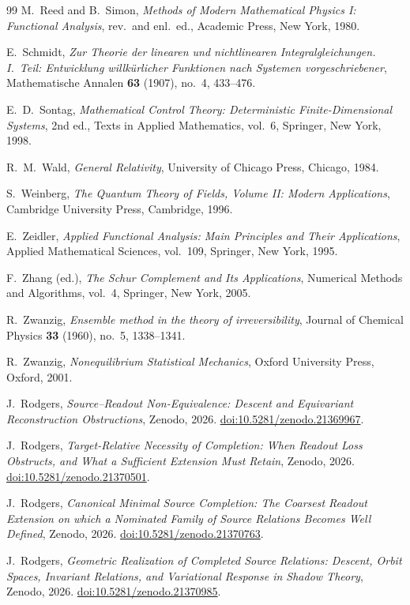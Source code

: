 \documentclass[11pt,reqno]{amsart}
\numberwithin{equation}{section}
\theoremstyle{plain}
\theoremstyle{definition}
\theoremstyle{remark}
\begin{document}
\begin{thebibliography}{99}
M.~Reed and B.~Simon,
\emph{Methods of Modern Mathematical Physics I: Functional Analysis},
rev.\ and enl.\ ed., Academic Press, New York, 1980.

E.~Schmidt,
\emph{Zur Theorie der linearen und nichtlinearen Integralgleichungen.
I.~Teil: Entwicklung willk\"urlicher Funktionen nach Systemen vorgeschriebener},
Mathematische Annalen \textbf{63} (1907), no.~4, 433--476.

E.~D.~Sontag,
\emph{Mathematical Control Theory: Deterministic Finite-Dimensional Systems},
2nd ed., Texts in Applied Mathematics, vol.~6, Springer, New York, 1998.

R.~M.~Wald,
\emph{General Relativity},
University of Chicago Press, Chicago, 1984.

S.~Weinberg,
\emph{The Quantum Theory of Fields, Volume II: Modern Applications},
Cambridge University Press, Cambridge, 1996.

E.~Zeidler,
\emph{Applied Functional Analysis: Main Principles and Their Applications},
Applied Mathematical Sciences, vol.~109, Springer, New York, 1995.

F.~Zhang (ed.),
\emph{The Schur Complement and Its Applications},
Numerical Methods and Algorithms, vol.~4, Springer, New York, 2005.

R.~Zwanzig,
\emph{Ensemble method in the theory of irreversibility},
Journal of Chemical Physics \textbf{33} (1960), no.~5, 1338--1341.

R.~Zwanzig,
\emph{Nonequilibrium Statistical Mechanics},
Oxford University Press, Oxford, 2001.

J.~Rodgers,
\emph{Source--Readout Non-Equivalence: Descent and Equivariant Reconstruction Obstructions},
Zenodo, 2026.
\href{https://doi.org/10.5281/zenodo.21369967}{doi:10.5281/zenodo.21369967}.

J.~Rodgers,
\emph{Target-Relative Necessity of Completion: When Readout Loss Obstructs,
and What a Sufficient Extension Must Retain},
Zenodo, 2026.
\href{https://doi.org/10.5281/zenodo.21370501}{doi:10.5281/zenodo.21370501}.

J.~Rodgers,
\emph{Canonical Minimal Source Completion: The Coarsest Readout Extension on which a
Nominated Family of Source Relations Becomes Well Defined},
Zenodo, 2026.
\href{https://doi.org/10.5281/zenodo.21370763}{doi:10.5281/zenodo.21370763}.

J.~Rodgers,
\emph{Geometric Realization of Completed Source Relations: Descent, Orbit Spaces,
Invariant Relations, and Variational Response in Shadow Theory},
Zenodo, 2026.
\href{https://doi.org/10.5281/zenodo.21370985}{doi:10.5281/zenodo.21370985}.

\end{thebibliography}
\end{document}
